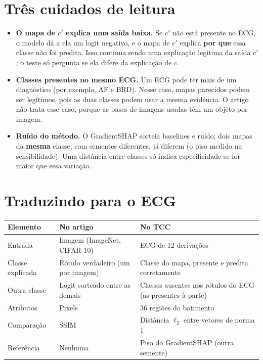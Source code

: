 \documentclass[11pt,a4paper]{article}
\begin{document}
\section{Três cuidados de leitura}
\begin{itemize}
\item \textbf{O mapa de $c'$ explica uma saída baixa.} Se $c'$ não está presente no ECG, o modelo dá a ela um logit negativo, e o mapa de $c'$ explica \textbf{por que} essa classe não foi predita. Isso continua sendo uma explicação legítima da saída $c'$; o teste só pergunta se ela difere da explicação de $c$.
\item \textbf{Classes presentes no mesmo ECG.} Um ECG pode ter mais de um diagnóstico (por exemplo, AF e BRD). Nesse caso, mapas parecidos podem ser legítimos, pois as duas classes podem usar a mesma evidência. O artigo não trata esse caso, porque as bases de imagens usadas têm um objeto por imagem.
\item \textbf{Ruído do método.} O GradientSHAP sorteia baselines e ruído; dois mapas da \textbf{mesma} classe, com sementes diferentes, já diferem (o piso medido na sensibilidade). Uma distância entre classes só indica especificidade se for maior que essa variação.
\end{itemize}

\section{Traduzindo para o ECG}\label{sec:ecg}
\begin{center}\small
\begin{tabularx}{\linewidth}{lXX}
\toprule
\textbf{Elemento} & \textbf{No artigo} & \textbf{No TCC} \\
\midrule
Entrada & Imagem (ImageNet, CIFAR-10) & ECG de 12 derivações \\
Classe explicada & Rótulo verdadeiro (um por imagem) & Classe do mapa, presente e predita corretamente \\
Outra classe & Logit sorteado entre as demais & Classes ausentes nos rótulos do ECG (as presentes à parte) \\
Atributos & Pixels & 36 regiões do batimento \\
Comparação & SSIM & Distância $\ell_2$ entre vetores de norma 1 \\
Referência & Nenhuma & Piso do GradientSHAP (outra semente) \\
\bottomrule
\end{tabularx}
\end{center}
\end{document}
